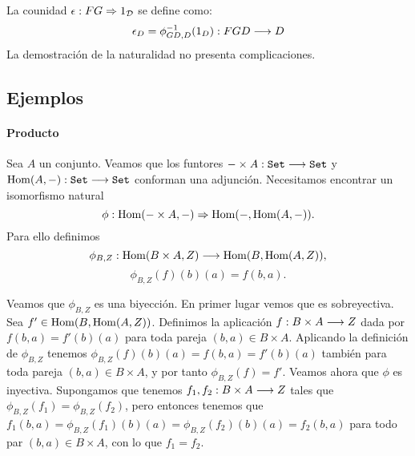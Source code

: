 La counidad $\epsilon: FG\Rightarrow 1_{\mathcal{D}}$ se define como:
$$\epsilon_D = \phi_{GD, D}^{-1}(1_D) : FGD\longrightarrow D$$
La demostración de la naturalidad no presenta complicaciones.

\subsection{Ejemplos}
\paragraph{Producto}
Sea $A$ un conjunto. Veamos que los funtores
$-\times A : \texttt{Set}\longrightarrow \texttt{Set}$ y
$\operatorname{Hom}(A, -) : \texttt{Set}\longrightarrow \texttt{Set}$ conforman una adjunción.
Necesitamos encontrar un isomorfismo natural
$$\phi : \operatorname{Hom}(-\times A, -)\Rightarrow \operatorname{Hom}(-, \operatorname{Hom}(A, -)).$$
Para ello definimos
$$\phi_{B, Z} : \operatorname{Hom}(B\times A, Z)\longrightarrow \operatorname{Hom}(B, \operatorname{Hom}(A, Z)),$$
$$\phi_{B, Z}(f)(b)(a) = f(b, a).$$

Veamos que $\phi_{B, Z}$ es una biyección.
En primer lugar vemos que es sobreyectiva.
Sea $f' \in \operatorname{Hom}(B, \operatorname{Hom}(A, Z))$. Definimos la aplicación
$f : B\times A\longrightarrow Z$ dada por $f(b, a) = f'(b)(a)$ para
toda pareja $(b, a) \in B\times A$. Aplicando
la definición de $\phi_{B, Z}$
tenemos $\phi_{B,Z}(f)(b)(a) = f(b, a) = f'(b)(a)$ también para toda
pareja $(b, a) \in B\times A$, y por tanto
$\phi_{B,Z}(f) = f'$. Veamos ahora que $\phi$ es inyectiva. Supongamos
que tenemos $f_1, f_2 : B\times A\longrightarrow Z$ tales que
$\phi_{B, Z}(f_1) = \phi_{B, Z}(f_2)$, pero entonces tenemos que
$f_1(b, a) = \phi_{B, Z}(f_1)(b)(a) = \phi_{B,Z}(f_2)(b)(a) = f_2(b, a)$
para todo par $(b, a) \in B\times A$,
con lo que $f_1 = f_2$.

